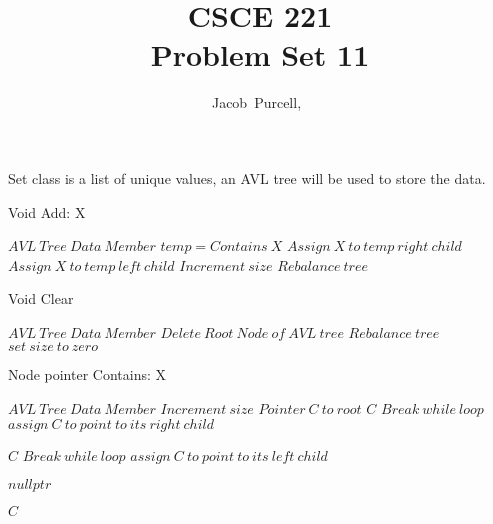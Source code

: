 \documentclass[journal]{IEEEtran}
\begin{document}
\title{CSCE 221 \\ Problem Set 11}

\author{Jacob~Purcell,~}

\maketitle
\section{}

Set class is a list of unique values, an AVL tree will be used to store the data.

\begin{algorithm}
    \caption{Void Add: X}
    \begin{algorithmic}
        \REQUIRE $AVL~Tree~Data~Member$
        \STATE $temp = Contains~X$
        \STATE $Assign~X~to~temp~right~child$
        \ENDIF
        \STATE $Assign~X~to~temp~left~child$
        \ENDIF
        \ENDIF
        \STATE $Increment~size$
        \STATE $Rebalance~tree$
    \end{algorithmic}
\end{algorithm}

\begin{algorithm}
    \caption{Void Clear}
    \begin{algorithmic}
        \REQUIRE $AVL~Tree~Data~Member$
        \STATE $Delete~Root~Node~of~AVL~tree$
        \STATE $Rebalance~tree$
        \ENDFOR
        \STATE $set~size~to~zero$
    \end{algorithmic}
\end{algorithm}

\begin{algorithm}
    \caption{Node pointer Contains: X}
    \begin{algorithmic}
        \REQUIRE $AVL~Tree~Data~Member$
        \STATE $Increment~size$
        \STATE $Pointer~C~to~root$
        \RETURN $C$
        \STATE $Break~while~loop$
        \ENDIF
        \STATE $assign~C~to~point~to~its~right~child$
        \ENDIF

        \RETURN $C$
        \STATE $Break~while~loop$
        \ENDIF
        \STATE $assign~C~to~point~to~its~left~child$
        \ENDIF

        \RETURN $nullptr$
        \ENDIF

        \ENDWHILE

        \RETURN $C$
    \end{algorithmic}
\end{algorithm}
\end{document}
